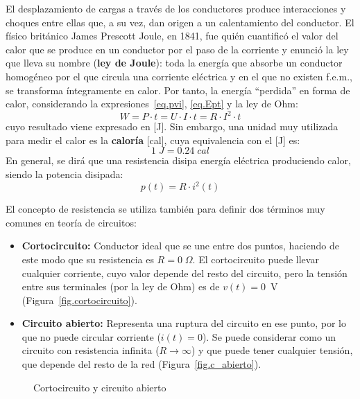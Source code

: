 \documentclass[11pt]{book} %
\numberwithin{dummy}{section}
\theoremstyle{ocrenumbox}
\theoremstyle{blacknumex}
\theoremstyle{blacknumbox}
\theoremstyle{ocrenum}
\newlength\esp
\begin{document}
	El desplazamiento de cargas a través de los conductores produce interacciones y choques entre ellas que, a su vez, dan
	origen a un calentamiento del conductor. El físico británico James Prescott Joule, en 1841, fue quién cuantificó el valor del calor que se produce en un conductor por el paso de la corriente y enunció la ley que lleva su nombre (\textbf{ley de Joule}): toda la energía que absorbe un conductor homogéneo por el que circula una corriente eléctrica y en el que no existen f.e.m., se transforma íntegramente en calor. Por tanto, la energía ``perdida'' en forma de calor, considerando la expresiones~\eqref{eq.pvi}, \eqref{eq.Ept} y la ley de Ohm:
	\begin{equation*}
		W=P\cdot t=U\cdot I\cdot t=R\cdot I^2\cdot t
	\end{equation*}
	cuyo resultado viene expresado en [J]. Sin embargo, una unidad muy utilizada para medir el calor es la \textbf{caloría} [cal], cuya equivalencia con el [J] es:
	\begin{equation*}
		1\;J=0.24\;cal
	\end{equation*}
	En general, se dirá que una resistencia disipa energía eléctrica produciendo calor, siendo la potencia disipada: 
	\begin{equation*}
		p(t)=R\cdot i^{2}(t)
	\end{equation*}
	
	El concepto de resistencia se utiliza también para definir dos términos muy comunes en teoría de circuitos:
	\begin{itemize}
		\item \textbf{Cortocircuito:} Conductor ideal que se une entre dos puntos, haciendo de este modo que su resistencia es $R=0\;\Omega$. El cortocircuito puede llevar cualquier corriente, cuyo valor depende del resto del circuito, pero la tensión entre sus terminales (por la ley de Ohm) es de $v(t)=0$~V (Figura~\ref{fig.cortocircuito}). 
		\item \textbf{Circuito abierto:} Representa una ruptura del circuito en ese punto, por lo que no puede circular corriente ($i(t)=0$). Se puede considerar como un circuito con resistencia infinita ($R\rightarrow\infty$) y que puede tener cualquier tensión, que depende del resto de la red (Figura~\ref{fig.c_abierto}).
	\end{itemize}
	\begin{figure}[htbp]
		\centering
		\hfil
		\caption{Cortocircuito y circuito abierto}
		
	\end{figure}
	
\end{document}
